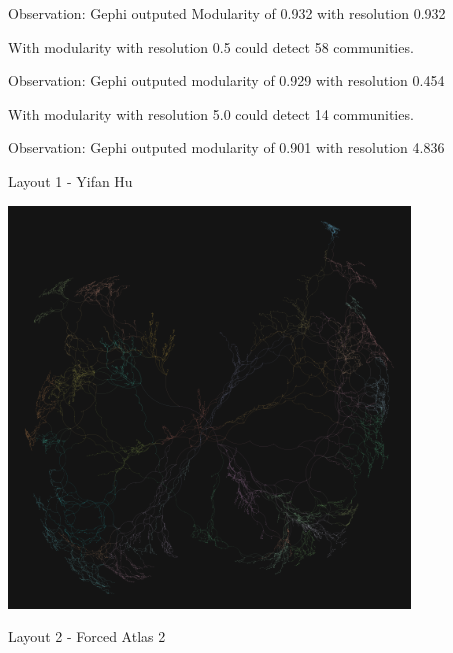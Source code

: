 \documentclass{amsart}
\theoremstyle{definition}
\theoremstyle{remark}
\numberwithin{equation}{section}
\begin{document}
\begin{enumerate}
Observation: Gephi outputed Modularity of 0.932 with resolution 0.932 \vspace{0.2cm}

With modularity with resolution 0.5 could detect 58 communities. \vspace{0.2cm}

Observation: Gephi outputed modularity of 0.929 with resolution 0.454 \vspace{0.2cm}

With modularity with resolution 5.0 could detect 14 communities. \vspace{0.2cm}
 
Observation: Gephi outputed modularity of 0.901 with resolution 4.836 \vspace{0.2cm}

Layout 1 - Yifan Hu \vspace{0.5cm}

\centering
\begin{minipage}{1\textwidth}
\centering
\includegraphics[width=0.8\textwidth]{images/power_layout01_v0.png} %
\end{minipage}

\vspace{0.5cm}

Layout 2 - Forced Atlas 2 \vspace{0.5cm}


\end{enumerate}
\end{document}

